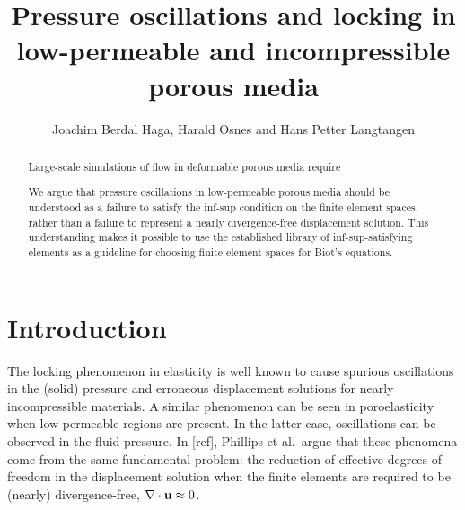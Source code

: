 





\noreceived{}%
\norevised{}%
\noaccepted{}%

\title{Pressure oscillations and locking in low-permeable and incompressible porous media}
\author{
  Joachim Berdal Haga\comma{}\comma\corrauth,
  Harald Osnes\comma{} and
  Hans Petter Langtangen\comma{}}
\address{%
\ Scientific Computing Department, Simula Research Laboratory, Norway\\
\ Department of Mathematics, University of Oslo, Norway\\
\ Department of Informatics, University of Oslo, Norway\\
\todop{\version}
}

\begin{abstract}
%
Large-scale simulations of flow in deformable porous media require

We argue that pressure oscillations in low-permeable porous media should be
understood as a failure to satisfy the inf-sup condition on the finite element
spaces, rather than a failure to represent a nearly divergence-free
displacement solution.
This understanding makes it possible to use the established library of
inf-sup-satisfying elements as a guideline for choosing finite element spaces
for Biot's equations.
\end{abstract}

\section*{Introduction}
The locking phenomenon in elasticity is well known to cause spurious
oscillations in the (solid) pressure and erroneous displacement solutions for
nearly incompressible materials.
A similar phenomenon can be seen in poroelasticity when low-permeable regions
are present.
In the latter case, oscillations can be observed in the fluid pressure. In
[ref], Phillips et al.~argue that these phenomena come from the same
fundamental problem: the reduction of effective degrees of freedom in the
displacement solution when the finite elements are required to be (nearly)
divergence-free, $\nabla \cdot \U\approx 0$.

